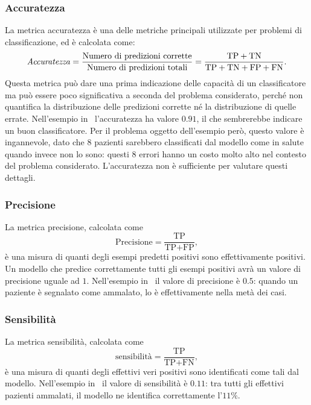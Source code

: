 
\subsubsection{Accuratezza} La metrica accuratezza è una delle metriche principali utilizzate per problemi di classificazione, ed è calcolata come:
\begin{equation*}
    \textrm{\emph{Accuratezza}} = \frac{\text{Numero di predizioni corrette}}{\text{Numero di predizioni totali}} = \frac{\text{TP} + \text{TN}}{\text{TP} + \text{TN} + \text{FP} + \text{FN}}.
\end{equation*}
Questa metrica può dare una prima indicazione delle capacità di un classificatore ma può essere poco significativa a seconda del problema considerato, perché non quantifica la distribuzione delle predizioni corrette né la distribuzione di quelle errate.
Nell'esempio in~ l'accuratezza ha valore $0.91$, il che sembrerebbe indicare un buon classificatore.
Per il problema oggetto dell'esempio però, questo valore è ingannevole, dato che 8 pazienti sarebbero classificati dal modello come in salute quando invece non lo sono: questi 8 errori hanno un costo molto alto nel contesto del problema considerato.
L'accuratezza non è sufficiente per valutare questi dettagli.

\subsubsection{Precisione} La metrica precisione, calcolata come
\begin{equation*}
    \textrm{Precisione} = \frac{\text{TP}}{\text{TP} + \text{FP}},
\end{equation*}
è una misura di quanti degli esempi predetti positivi sono effettivamente positivi.
Un modello che predice correttamente tutti gli esempi positivi avrà un valore di precisione uguale ad $1$.
Nell'esempio in~ il valore di precisione è $0.5$: quando un paziente è segnalato come ammalato, lo è effettivamente nella metà dei casi.

\subsubsection{Sensibilità} La metrica sensibilità, calcolata come 
\begin{equation*}
    \textrm{sensibilità} = \frac{\text{TP}}{\text{TP} + \text{FN}},
\end{equation*}
è una misura di quanti degli effettivi veri positivi sono identificati come tali dal modello.
Nell'esempio in~ il valore di sensibilità è $0.11$: tra tutti gli effettivi pazienti ammalati, il modello ne identifica correttamente l'$11\%$.


